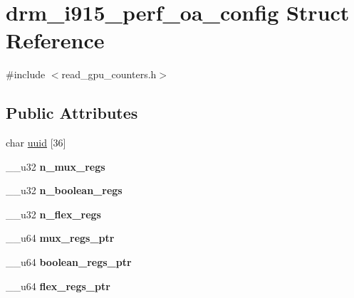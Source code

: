 \hypertarget{structdrm__i915__perf__oa__config}{}\section{drm\+\_\+i915\+\_\+perf\+\_\+oa\+\_\+config Struct Reference}
\label{structdrm__i915__perf__oa__config}


{\ttfamily \#include $<$read\+\_\+gpu\+\_\+counters.\+h$>$}

\subsection*{Public Attributes}
\begin{DoxyCompactItemize}
\item 
char \hyperlink{structdrm__i915__perf__oa__config_a2b0d98bfda89545391b587c92edb7a93}{uuid} \mbox{[}36\mbox{]}
\item 
\mbox{\label{structdrm__i915__perf__oa__config_aa4d56c228dd72760caf37fa1414962dc}} 
\+\_\+\+\_\+u32 {\bfseries n\+\_\+mux\+\_\+regs}
\item 
\mbox{\label{structdrm__i915__perf__oa__config_a0079f9e0332a17ec87c44c1854c2dfdd}} 
\+\_\+\+\_\+u32 {\bfseries n\+\_\+boolean\+\_\+regs}
\item 
\mbox{\label{structdrm__i915__perf__oa__config_a09d186717c203e10d4a772d8a43043a6}} 
\+\_\+\+\_\+u32 {\bfseries n\+\_\+flex\+\_\+regs}
\item 
\mbox{\label{structdrm__i915__perf__oa__config_ab2195620d3828c6a705c02ce2a3bfac1}} 
\+\_\+\+\_\+u64 {\bfseries mux\+\_\+regs\+\_\+ptr}
\item 
\mbox{\label{structdrm__i915__perf__oa__config_a0835fe25c890be70cafcac0b5a0160d4}} 
\+\_\+\+\_\+u64 {\bfseries boolean\+\_\+regs\+\_\+ptr}
\item 
\mbox{\label{structdrm__i915__perf__oa__config_ab01fe70d161f0b394d36d3b9f216e851}} 
\+\_\+\+\_\+u64 {\bfseries flex\+\_\+regs\+\_\+ptr}
\end{DoxyCompactItemize}


